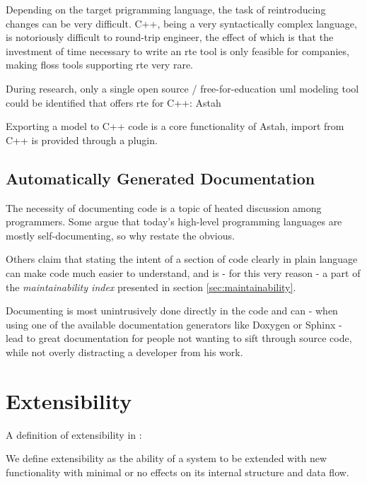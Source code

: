 Depending on the target prigramming language, the task of reintroducing changes can be very difficult. C++, being a very syntactically complex language, is notoriously difficult to round-trip engineer, the effect of which is that the investment of time necessary to write an \gls{rte} tool is only feasible for companies, making \gls{floss} tools supporting \gls{rte} very rare.

During research, only a single open source / free-for-education \gls{uml} modeling tool could be identified that offers \gls{rte} for C++: Astah

Exporting a model to C++ code is a core functionality of Astah, import from C++ is provided through a plugin.

\subsection{Automatically Generated Documentation}\label{sec:resdoxygen}
The necessity of documenting code is a topic of heated discussion among programmers. Some argue that today's high-level programming languages are mostly self-documenting, so why restate the obvious.

Others claim that stating the intent of a section of code clearly in plain language can make code much easier to understand, and is - for this very reason - a part of the \textit{maintainability index} presented in section \ref{sec:maintainability}.

Documenting is most unintrusively done directly in the code and can - when using one of the available documentation generators like Doxygen or Sphinx - lead to great documentation for people not wanting to sift through source code, while not overly distracting a developer from his work.

\section{Extensibility}

A definition of extensibility in \citet[p.3]{Johansson}:
\begin{definition}[Extensibility]
We define extensibility as the ability of a system to be extended with new functionality with minimal or no effects on its internal structure and data flow.
\end{definition}

